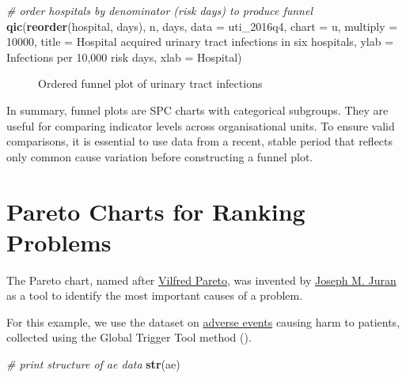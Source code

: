 \documentclass[
]{book}
\makeatletter
\newenvironment{Shaded}{\begin{snugshade}}{\end{snugshade}}
\newcommand{\AttributeTok}[1]{\textcolor[rgb]{0.13,0.29,0.53}{#1}}
\newcommand{\CommentTok}[1]{\textcolor[rgb]{0.56,0.35,0.01}{\textit{#1}}}
\newcommand{\DecValTok}[1]{\textcolor[rgb]{0.00,0.00,0.81}{#1}}
\newcommand{\FunctionTok}[1]{\textcolor[rgb]{0.13,0.29,0.53}{\textbf{#1}}}
\newcommand{\NormalTok}[1]{#1}
\newcommand{\StringTok}[1]{\textcolor[rgb]{0.31,0.60,0.02}{#1}}
\newcommand*\pandocbounded[1]{%
  \sbox\pandoc@box{#1}%
  \Gscale@div\@tempa{\textheight}{\dimexpr\ht\pandoc@box+\dp\pandoc@box\relax}%
  \Gscale@div\@tempb{\linewidth}{\wd\pandoc@box}%
  \ifdim\@tempb\p@<\@tempa\p@\let\@tempa\@tempb\fi%
  \ifdim\@tempa\p@<\p@\scalebox{\@tempa}{\usebox\pandoc@box}%
  \else\usebox{\pandoc@box}%
  \fi%
}
\makeatother
\begin{document}
\begin{Shaded}
\begin{Highlighting}[]
\CommentTok{\# order hospitals by denominator (risk days) to produce funnel}
\FunctionTok{qic}\NormalTok{(}\FunctionTok{reorder}\NormalTok{(hospital, days), n, days,}
    \AttributeTok{data     =}\NormalTok{ uti\_2016q4,}
    \AttributeTok{chart    =} \StringTok{\textquotesingle{}u\textquotesingle{}}\NormalTok{,}
    \AttributeTok{multiply =} \DecValTok{10000}\NormalTok{,}
    \AttributeTok{title    =} \StringTok{\textquotesingle{}Hospital acquired urinary tract infections in six hospitals\textquotesingle{}}\NormalTok{,}
    \AttributeTok{ylab     =} \StringTok{\textquotesingle{}Infections per 10,000 risk days\textquotesingle{}}\NormalTok{,}
    \AttributeTok{xlab     =} \StringTok{\textquotesingle{}Hospital\textquotesingle{}}\NormalTok{)}
\end{Highlighting}
\end{Shaded}

\begin{figure}
\centering
\pandocbounded{}
\caption{\label{fig:funnel-fig3}Ordered funnel plot of urinary tract infections}
\end{figure}

In summary, funnel plots are SPC charts with categorical subgroups. They are useful for comparing indicator levels across organisational units. To ensure valid comparisons, it is essential to use data from a recent, stable period that reflects only common cause variation before constructing a funnel plot.

\chapter{Pareto Charts for Ranking Problems}\label{pareto-charts-for-ranking-problems}

The Pareto chart, named after \href{https://en.wikipedia.org/wiki/Vilfredo_Pareto}{Vilfred Pareto}, was invented by \href{https://en.wikipedia.org/wiki/Joseph_M._Juran}{Joseph M. Juran} as a tool to identify the most important causes of a problem.

For this example, we use the dataset on \hyperref[adverse-events]{adverse events} causing harm to patients, collected using the Global Trigger Tool method ().

\begin{Shaded}
\begin{Highlighting}[]
\CommentTok{\# print structure of ae data}
\FunctionTok{str}\NormalTok{(ae)}
\end{Highlighting}
\end{Shaded}
\end{document}
